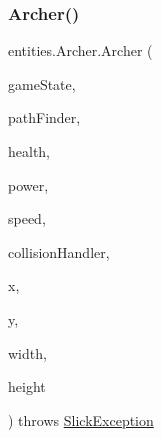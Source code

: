 \subsubsection{\texorpdfstring{Archer()}{Archer()}}
{\footnotesize\ttfamily entities.\+Archer.\+Archer (\begin{DoxyParamCaption}\item[{\mbox{\hyperlink{classstates_1_1_game_state}{Game\+State}}}]{game\+State,  }\item[{\mbox{\hyperlink{classentities_1_1_path_finder}{Path\+Finder}}}]{path\+Finder,  }\item[{int}]{health,  }\item[{int}]{power,  }\item[{float}]{speed,  }\item[{\mbox{\hyperlink{classentities_1_1_collision_handler}{Collision\+Handler}}}]{collision\+Handler,  }\item[{float}]{x,  }\item[{float}]{y,  }\item[{float}]{width,  }\item[{float}]{height }\end{DoxyParamCaption}) throws \mbox{\hyperlink{classorg_1_1newdawn_1_1slick_1_1_slick_exception}{Slick\+Exception}}\hspace{0.3cm}{\ttfamily [inline]}}


